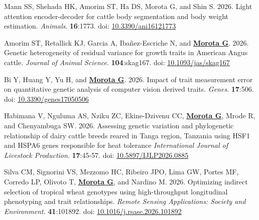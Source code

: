 \documentclass[margin,line,10pt]{res}
\newenvironment{list1}{
  \begin{list}{\ding{113}}{%
      \setlength{\itemsep}{0in}
      \setlength{\parsep}{0in} \setlength{\parskip}{0in}
      \setlength{\topsep}{0in} \setlength{\partopsep}{0in} 
      \setlength{\leftmargin}{0.17in}}}{\end{list}}
\begin{document}
\begin{resume}
\begin{list1}
  \vspace{0.5cm}

  \item  [{\bf 97}.] Mann SS, Shehada HK, Amorim ST, Ha DS, Morota G, and Shin S. 2026. Light attention encoder-decoder for cattle body segmentation and body weight estimation. \emph{Animals}. \textbf{16}:1773. doi: \textcolor{blue}{\href{https://doi.org/10.3390/ani16121773}{10.3390/ani16121773}} 

  \vspace{0.5cm}

  \item  [{\bf 96}.] Amorim ST, Retallick KJ, Garcia A, Iba\~{n}ez-Escriche N, and \textbf{\underline{Morota G}}. 2026. Genetic heterogeneity of residual variance for growth traits in American Angus cattle. \emph{Journal of Animal Science}. \textbf{104}:skag167. doi: \textcolor{blue}{\href{https://doi.org/10.1093/jas/skag167}{10.1093/jas/skag167}} 


  \vspace{0.5cm}


  \item  [{\bf 95}.] Bi Y, Huang Y, Yu H, and \textbf{\underline{Morota G}}. 2026. Impact of trait measurement error on quantitative genetic analysis of computer vision derived traits. \emph{Genes}. \textbf{17}:506. doi: \textcolor{blue}{\href{https://doi.org/10.3390/genes17050506}{10.3390/genes17050506}} 

  \vspace{0.5cm}

  \item [{\bf 94}.]  Habimana V, Nguluma AS, Nziku ZC, Ekine-Dzivenu CC, \textbf{\underline{Morota G}}, Mrode R, and Chenyambuga SW. 2026. Assessing genetic variation and phylogenetic relationship of dairy cattle breeds reared in Tanga region, Tanzania using HSF1 and HSPA6 genes responsible for heat tolerance \emph{International Journal of Livestock Production}. \textbf{17}:45-57. doi: \textcolor{blue}{\href{https://doi.org/10.5897/IJLP2026.0885}{10.5897/IJLP2026.0885}} 

  \vspace{0.5cm}


\item [{\bf 93}.] Silva CM,  Signorini VS,  Mezzomo HC, Ribeiro JPO, Lima GW, Portes MF, Corredo LP, Olivoto T, \textbf{\underline{Morota G}}, and Nardino M. 2026. Optimizing indirect selection of tropical wheat genotypes using high-throughput longitudinal phenotyping and trait relationships. \emph{Remote Sensing Applications: Society and Environment}. \textbf{41}:101892. doi: \textcolor{blue}{\href{https://doi.org/10.1016/j.rsase.2026.101892}{10.1016/j.rsase.2026.101892}} 


\end{list1}
\end{resume}
\end{document}

